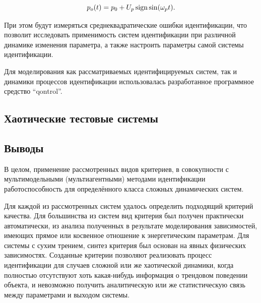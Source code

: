 \documentclass[a4paper,paratype,12pt,fouriernc]{cmonogra}
\begin{document}
\begin{equation}
  p_o(t) = p_0 + U_{p} \operatorname*{sign} \sin( \omega_{p} t ).
  \label{atu:eq:p_sign}
\end{equation}

При этом будут измеряться среднеквадратические ошибки идентификации,
что позволит исследовать применимость систем идентификации
при различной динамике изменения параметра, а также
настроить параметры самой системы идентификации.

Для моделирования как рассматриваемых идентифицируемых систем,
так и динамики процессов идентификации использовалась разработанное
программное средство ``qontrol''.


\subsection*{Хаотические тестовые системы }


% 












\subsection*{Выводы}

В целом, применение рассмотренных видов критериев, в совокупности
с мультимодельными (мультиагентными) методами идентификации
работоспособность для определённого класса сложных динамических систем.



Для каждой из рассмотренных систем удалось определить подходящий
критерий качества. Для большинства из систем вид критерия
был получен практически автоматически, из анализа полученных
в результате моделирования зависимостей, имеющих прямое или косвенное отношение
к энергетическим параметрам. Для системы с сухим трением,
синтез критерия был основан на явных физических зависимостях.
Созданные критерии позволяют реализовать процесс идентификации для случаев
сложной или же хаотической динамики,
когда полностью отсутствуют хоть какая-нибудь информация о
трендовом поведении объекта, и невозможно получить аналитическую
или же статистическую связь между параметрами и выходом системы.
\end{document}
